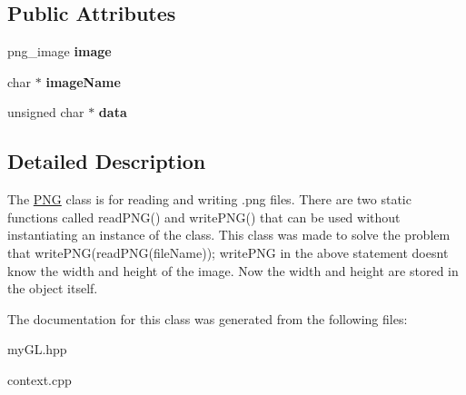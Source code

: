 \subsection*{Public Attributes}
\begin{DoxyCompactItemize}
\item 
\hypertarget{classPNG_adcccee60854d7ef75c4f516b26d9be7e}{}png\+\_\+image {\bfseries image}\label{classPNG_adcccee60854d7ef75c4f516b26d9be7e}

\item 
\hypertarget{classPNG_af06d37031363a6e28cd16cde17fe87bf}{}char $\ast$ {\bfseries image\+Name}\label{classPNG_af06d37031363a6e28cd16cde17fe87bf}

\item 
\hypertarget{classPNG_af96e0999d0c4b3fb0219462daf297d92}{}unsigned char $\ast$ {\bfseries data}\label{classPNG_af96e0999d0c4b3fb0219462daf297d92}

\end{DoxyCompactItemize}


\subsection{Detailed Description}
The \hyperlink{classPNG}{P\+N\+G} class is for reading and writing \textquotesingle{}.png\textquotesingle{} files. There are two static functions called read\+P\+N\+G() and write\+P\+N\+G() that can be used without instantiating an instance of the class. This class was made to solve the problem that write\+P\+N\+G(read\+P\+N\+G(file\+Name)); write\+P\+N\+G in the above statement doesn\textquotesingle{}t know the width and height of the image. Now the width and height are stored in the object itself. 

The documentation for this class was generated from the following files\+:\begin{DoxyCompactItemize}
\item 
my\+G\+L.\+hpp\item 
context.\+cpp\end{DoxyCompactItemize}
